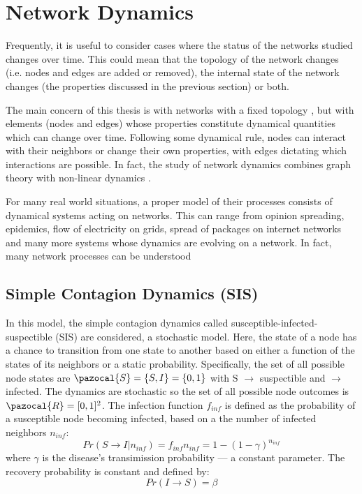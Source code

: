 \clearpage
\section{Network Dynamics}

Frequently, it is useful to consider cases where the status of the
networks studied changes over time. This could mean that the topology
of the network changes (i.e. nodes and edges are added or removed),
the internal state of the network changes (the properties discussed in
the previous section) or both. 

The main concern of this thesis is with networks with a fixed topology
, but with elements (nodes and edges) whose properties constitute
dynamical quantities which can change over time. Following some dynamical
rule, nodes can interact with their neighbors or change their own
properties, with edges dictating which interactions are possible.
In fact, the study of network dynamics combines graph theory with
non-linear dynamics \cite{book:Jost2007}.

For many real world situations, a proper model of their processes
consists of dynamical systems acting on networks. This can range
from opinion spreading, epidemics, flow of electricity on grids,
spread of packages on internet networks and many more systems
whose dynamics are evolving on a network. In fact, many network
processes can be understood 

\subsection{Simple Contagion Dynamics (SIS)}\label{sec:SIS}

In this model, the simple contagion dynamics called
susceptible-infected-suspectible (SIS) are considered, a stochastic
model. Here, the state of a node has a chance to transition from one
state to another based on either a function of the states of its
neighbors or a static probability. Specifically, the set of all
possible node states are $\pazocal{S} = \{S, I\} = \{0, 1\}$ with S $\rightarrow$
suspectible and $\rightarrow$ infected. The dynamics are stochastic
so the set of all possible node outcomes is $\pazocal{R} = [0, 1]^2$.
The infection function $f_{inf}$ is defined as the probability of a
susceptible node becoming infected, based on a the number of infected
neighbors $n_{inf}$:
\begin{equation}
  \label{eq:prob_inf}
  Pr(S \rightarrow I|n_{inf}) = f_{inf}{n_{inf}} = 1 - (1 - \gamma)^{n_{inf}}
\end{equation}
where $\gamma$ is the disease's transimission probability --- a constant
parameter.
The recovery probability is constant and defined by:
\begin{equation}
  \label{eq:prob_rec}
  Pr(I \rightarrow S) = \beta
\end{equation}

